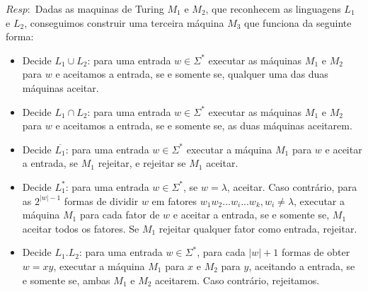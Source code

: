 \documentclass{homework}
\begin{document}
	$Resp:$ Dadas as maquinas de Turing $M_1$ e $M_2$, que reconhecem as linguagens $L_1$ e $L_2$, conseguimos construir uma terceira máquina $M_3$ que funciona da seguinte forma:
	\begin{itemize}
		\item Decide $L_1 \cup L_2$: para uma entrada $w \in \Sigma^*$ executar as máquinas $M_1$ e $M_2$ para $w$ e aceitamos a entrada, se e somente se, qualquer uma das duas máquinas aceitar.
		\item Decide $L_1 \cap L_2$: para uma entrada $w \in \Sigma^*$ executar as máquinas $M_1$ e $M_2$ para $w$ e aceitamos a entrada, se e somente se, as duas máquinas aceitarem.
		\item Decide $\overline{L_1}$: para uma entrada $w \in \Sigma^*$ executar a máquina $M_1$ para $w$ e aceitar a entrada, se $M_1$ rejeitar, e rejeitar se $M_1$ aceitar.
		\item Decide $L_1^*$: para uma entrada $w \in \Sigma^*$, se $w = \lambda$, aceitar. Caso contrário, para as $2^{|w|-1}$ formas de dividir $w$ em fatores $w_1w_2...w_i...w_k, w_i \neq \lambda$, executar a máquina $M_1$ para cada fator de $w$ e aceitar a entrada, se e somente se, $M_1$ aceitar todos os fatores. Se $M_1$ rejeitar qualquer fator como entrada, rejeitar.
		\item Decide $L_1.L_2$: para uma entrada $w \in \Sigma^*$, para cada $|w| + 1$ formas de obter $w = xy$, executar a máquina $M_1$ para $x$ e $M_2$ para $y$, aceitando a entrada, se e somente se, ambas $M_1$ e $M_2$ aceitarem. Caso contrário, rejeitamos.
	\end{itemize}
\end{document}
